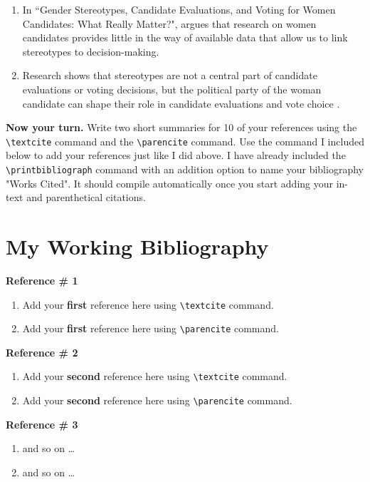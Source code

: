 \documentclass{article}
\begin{document}
\begin{enumerate}
    \item In ``Gender Stereotypes, Candidate Evaluations, and Voting for Women Candidates: What Really Matter?", \textcite{dolan_gender_2014} argues that research on women candidates provides little in the way of available data that allow us to link stereotypes to decision-making.
    \item Research shows that stereotypes are not a central part of candidate evaluations or voting decisions, but the political party of the woman candidate can shape their role in candidate evaluations and vote choice \parencite{dolan_gender_2014}.
\end{enumerate}

\textbf{Now your turn.} Write two short summaries for 10 of your references using the \verb|\textcite| command and the \verb|\parencite| command. Use the command I included below to add your references just like I did above. I have already included the \verb|\printbibliograph| command with an addition option to name your bibliography "Works Cited". It should compile automatically once you start adding your in-text and parenthetical citations.

\newpage
\section*{My Working Bibliography}

\textbf{Reference \# 1}

\begin{enumerate}
    \item Add your \textbf{first} reference here using \verb|\textcite| command.
    \item Add your \textbf{first} reference here using \verb|\parencite| command.
\end{enumerate}

\textbf{Reference \# 2}

\begin{enumerate}
    \item Add your \textbf{second} reference here using \verb|\textcite| command.
    \item Add your \textbf{second} reference here using \verb|\parencite| command. 
\end{enumerate}

\textbf{Reference \# 3}

\begin{enumerate}
    \item and so on \ldots
    \item and so on \ldots
\end{enumerate}
\end{document}
